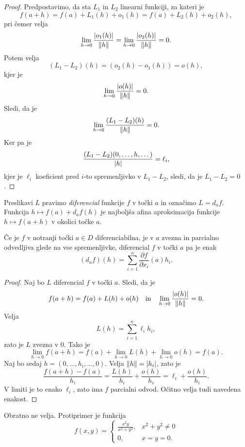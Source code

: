 \begin{proof}
Predpostavimo, da sta $L_1$ in $L_2$ linearni funkciji, za kateri je
\[
f(a+h)=f(a)+L_1(h)+o_1(h)=f(a)+L_2(h)+o_2(h),
\]
pri čemer velja
\[
\lim_{h\to 0}\frac{\left\lvert o_1(h)\right\rvert}{\left\lVert h\right\rVert}=\lim_{h\to 0}\frac{\left\lvert o_2(h)\right\rvert}{\left\lVert h\right\rVert}=0.
\]
Potem velja
\[
(L_1-L_2)(h)=(o_2(h)-o_1(h))=o(h),
\]
kjer je
\[
\lim_{h\to 0}\frac{\left\lvert o(h)\right\rvert}{\left\lVert h\right\rVert}=0.
\]
Sledi, da je
\[
\lim_{h\to 0}\frac{(L_1-L_2)(h)}{\left\lVert h\right\rVert}=0.
\]
Ker pa je
\[
\frac{(L_1-L_2)(0,\dots,h,\dots)}{\left\lvert h\right\rvert}=\ell_i,
\]
kjer je $\ell_i$ koeficient pred $i$-to spremenljivko v $L_1-L_2$, sledi, da je $L_1-L_2=0$.
\end{proof}


\begin{opomba}
Preslikavi $L$ pravimo \emph{diferencial} funkcije $f$ v točki $a$ in označimo $L=d_af$. Funkcija $h\mapsto f(a)+d_af(h)$ je najboljša afina aproksimacija funkcije $h\mapsto f(a+h)$ v okolici točke $a$.
\end{opomba}

\begin{izrek}
Če je $f$ v notranji točki $a\in D$ diferenciabilna, je v $a$ zvezna in parcialno odvedljiva glede na vse spremenljivke, diferencial $f$ v točki $a$ pa je enak
\[
(d_af)(h)=\sum_{i=1}^n \frac{\partial f}{\partial x_i}(a) h_i.
\]
\end{izrek}

\begin{proof}
Naj bo $L$ diferencial $f$ v točki $a$. Sledi, da je
\[
f(a+h)=f(a)+L(h)+o(h)\quad\text{in}\quad\lim_{h\to 0}\frac{\left\lvert o(h)\right\rvert}{\left\lVert h\right\rVert}=0.
\]
Velja
\[
L(h)=\sum_{i=1}^n \ell_i h_i,
\]
zato je $L$ zvezna v $0$. Tako je
\[
\lim_{h\to 0}f(a+h)=f(a)+\lim_{h\to 0} L(h)+\lim_{h\to 0}o(h)=f(a).
\]
Naj bo sedaj $h=(0,\dots,h_i,\dots,0)$. Velja $\left\lVert h\right\rVert=\left\lvert h_i\right\rvert$, zato je
\[
\frac{f(a+h)-f(a)}{h_i}=\frac{L(h)}{h_i}+\frac{o(h)}{h_i}=\ell_i+\frac{o(h)}{h_i}.
\]
V limiti je to enako $\ell_i$, zato ima $f$ parcialni odvod. Očitno velja tudi navedena enakost.
\end{proof}

\begin{opomba}
Obratno ne velja. Protiprimer je funkcija
\[
f(x,y)=\begin{cases}
\frac{x^2y}{x^2+y^2},& x^2+y^2\ne 0 \\
0,& x=y=0.
\end{cases}
\]
\end{opomba}

